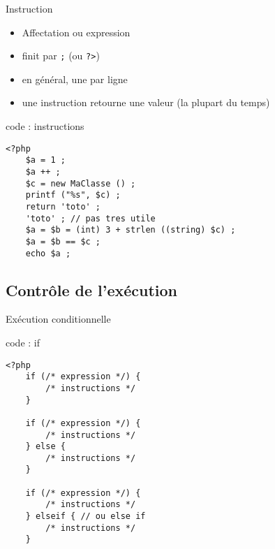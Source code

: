\begin{frame}[containsverbatim]{Instruction}
\begin{itemize}
\item Affectation ou expression
\item finit par \texttt{;} (ou \texttt{?>})
\item en général, une par ligne
\item une instruction retourne une valeur (la plupart du temps)
\end{itemize}
\begin{block}{code : instructions}
\begin{lstlisting}
<?php
	$a = 1 ;
	$a ++ ;
	$c = new MaClasse () ;
	printf ("%s", $c) ;
	return 'toto' ;
	'toto' ; // pas tres utile
	$a = $b = (int) 3 + strlen ((string) $c) ;
	$a = $b == $c ;
	echo $a ;
\end{lstlisting}
\end{block}
\end{frame}

\subsection{Contrôle de l’exécution}

\begin{frame}[containsverbatim]{Exécution conditionnelle} %
\begin{block}{code : if}
\begin{lstlisting}
<?php
	if (/* expression */) {
		/* instructions */
	}
	
	if (/* expression */) {
		/* instructions */
	} else {
		/* instructions */
	}
	
	if (/* expression */) {
		/* instructions */
	} elseif { // ou else if
		/* instructions */
	}
\end{lstlisting}
\end{block}
\end{frame}

